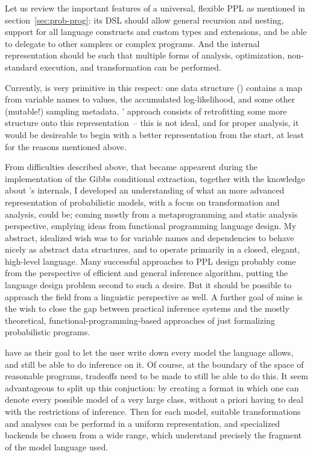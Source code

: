 Let us review the important features of a universal, flexible PPL as mentioned in
section~\ref{sec:prob-prog}: its DSL should allow general recursion and nesting, support for all
language constructs and custom types and extensions, and be able to delegate to other samplers or
complex programs.  And the internal representation should be such that multiple forms of analysis,
optimization, non-standard execution, and transformation can be performed.

Currently, \turingjl{} is very primitive in this respect: one data structure ()
contains a map from variable names to values, the accumulated log-likelihood, and some other
(mutable!) sampling metadata. \autogibbsjl{}' approach consists of retrofitting some more structure
onto this representation~-- this is not ideal, and for proper analysis, it would be desireable to
begin with a better representation from the start, at least for the reasons mentioned above.

From difficulties described above, that became appearent during the implementation of the Gibbs
conditional extraction, together with the knowledge about \dppljl{}'s internals, I developed an
understanding of what an more advanced representation of probabilistic models, with a focus on
transformation and analysis, could be; coming mostly from a metaprogramming and static analysis
perspective, emplying ideas from functional programming language design.  My abstract, idealized
wish was to for variable names and dependencies to behave nicely as abstract data structures, and to
operate primarily in a closed, elegant, high-level language.  Many successful approaches to PPL
design probably come from the perspective of efficient and general inference algorithm, putting the
language design problem second to such a desire.  But it should be possible to approach the field
from a linguistic perspective as well.  A further goal of mine is the wish to close the gap between
practical inference systems and the mostly theoretical, functional-programming-based approaches of
just formalizing probabilistic programs.

 have as their goal to let the user write down every model the language
allows, and still be able to do inference on it.  Of course, at the boundary of the space of
reasonable programs, tradeoffs need to be made to still be able to do this.  It seem advantageous to
split up this conjuction: by creating a format in which one can denote every possible model of a
very large class, without a priori having to deal with the restrictions of inference.  Then for each
model, suitable transformations and analyses can be performd in a uniform representation, and
specialized backends be chosen from a wide range, which understand precisely the fragment of the
model language used.

